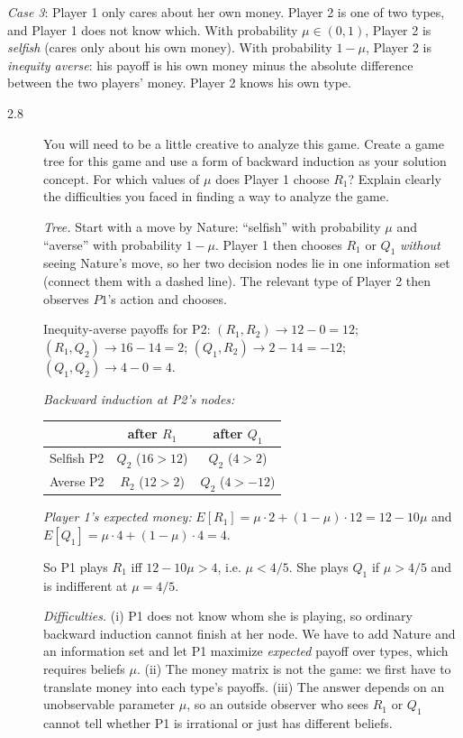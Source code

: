 \emph{Case 3}: Player 1 only cares about her own money. Player 2 is one of two types, and Player 1 does not know which. With probability $\mu\in(0,1)$, Player 2 is \emph{selfish} (cares only about his own money). With probability $1-\mu$, Player 2 is \emph{inequity averse}: his payoff is his own money minus the absolute difference between the two players' money. Player 2 knows his own type.

\begin{description}
\item[2.8] You will need to be a little creative to analyze this game. Create a game tree for this game and use a form of backward induction as your solution concept. For which values of $\mu$ does Player 1 choose $R_1$? Explain clearly the difficulties you faced in finding a way to analyze the game.
\begin{solution}
\emph{Tree.} Start with a move by Nature: ``selfish'' with probability $\mu$ and ``averse'' with probability $1-\mu$. Player 1 then chooses $R_1$ or $Q_1$ \emph{without} seeing Nature's move, so her two decision nodes lie in one information set (connect them with a dashed line). The relevant type of Player 2 then observes $P1$'s action and chooses.

Inequity-averse payoffs for P2: $(R_1,R_2)\to 12-0=12$; $(R_1,Q_2)\to16-14=2$; $(Q_1,R_2)\to 2-14=-12$; $(Q_1,Q_2)\to 4-0=4$.

\emph{Backward induction at P2's nodes:}
\begin{center}
\begin{tabular}{lcc}
 & after $R_1$ & after $Q_1$\\ \hline
Selfish P2 & $Q_2$ ($16>12$) & $Q_2$ ($4>2$)\\
Averse P2 & $R_2$ ($12>2$) & $Q_2$ ($4>-12$)
\end{tabular}
\end{center}
\emph{Player 1's expected money:}
$E[R_1]=\mu\cdot 2+(1-\mu)\cdot 12=12-10\mu$ and $E[Q_1]=\mu\cdot4+(1-\mu)\cdot4=4$.

So P1 plays $R_1$ iff $12-10\mu>4$, i.e. $\mu<4/5$. She plays $Q_1$ if $\mu>4/5$ and is indifferent at $\mu=4/5$.

\emph{Difficulties.} (i) P1 does not know whom she is playing, so ordinary backward induction cannot finish at her node. We have to add Nature and an information set and let P1 maximize \emph{expected} payoff over types, which requires beliefs $\mu$. (ii) The money matrix is not the game: we first have to translate money into each type's payoffs. (iii) The answer depends on an unobservable parameter $\mu$, so an outside observer who sees $R_1$ or $Q_1$ cannot tell whether P1 is irrational or just has different beliefs.
\end{solution}
\end{description}

